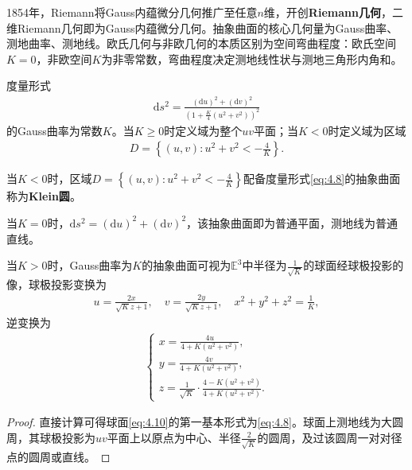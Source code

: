 \documentclass[../../main.tex]{subfiles}%
\begin{document}
\begin{remark}
1854年，Riemann将Gauss内蕴微分几何推广至任意$n$维，开创\textbf{Riemann几何}，二维Riemann几何即为Gauss内蕴微分几何。抽象曲面的核心几何量为Gauss曲率、测地曲率、测地线。欧氏几何与非欧几何的本质区别为空间弯曲程度：欧氏空间$K=0$，非欧空间$K$为非零常数，弯曲程度决定测地线性状与测地三角形内角和。
\end{remark}

\begin{proposition}
度量形式
\begin{align}
\mathrm{d}s^2=\frac{(\mathrm{d}u)^2+(\mathrm{d}v)^2}{\left(1+\frac{K}{4}(u^2+v^2)\right)^2}\label{eq:4.8}
\end{align}
的Gauss曲率为常数$K$。当$K\geqslant0$时定义域为整个$uv$平面；当$K<0$时定义域为区域
\begin{align*}
D=\left\{(u,v):u^2+v^2<-\frac{4}{K}\right\}.
\end{align*}
\end{proposition}

\begin{definition}
当$K<0$时，区域$D=\left\{(u,v):u^2+v^2<-\frac{4}{K}\right\}$配备度量形式\eqref{eq:4.8}的抽象曲面称为\textbf{Klein圆}。
\end{definition}

\begin{example}
当$K=0$时，$\mathrm{d}s^2=(\mathrm{d}u)^2+(\mathrm{d}v)^2$，该抽象曲面即为普通平面，测地线为普通直线。
\end{example}

\begin{proposition}
当$K>0$时，Gauss曲率为$K$的抽象曲面可视为$\mathbb{E}^3$中半径为$\frac{1}{\sqrt{K}}$的球面经球极投影的像，球极投影变换为
\begin{align}
u=\frac{2x}{\sqrt{K}z+1},\quad v=\frac{2y}{\sqrt{K}z+1},\quad x^2+y^2+z^2=\frac{1}{K},\label{eq:4.9}
\end{align}
逆变换为
\begin{align}
\begin{cases}
x=\frac{4u}{4+K(u^2+v^2)},\\
y=\frac{4v}{4+K(u^2+v^2)},\\
z=\frac{1}{\sqrt{K}}\cdot\frac{4-K(u^2+v^2)}{4+K(u^2+v^2)}.
\end{cases}\label{eq:4.10}
\end{align}
\end{proposition}

\begin{proof}
直接计算可得球面\eqref{eq:4.10}的第一基本形式为\eqref{eq:4.8}。球面上测地线为大圆周，其球极投影为$uv$平面上以原点为中心、半径$\frac{2}{\sqrt{K}}$的圆周，及过该圆周一对对径点的圆周或直线。
\end{proof}
\end{document}
